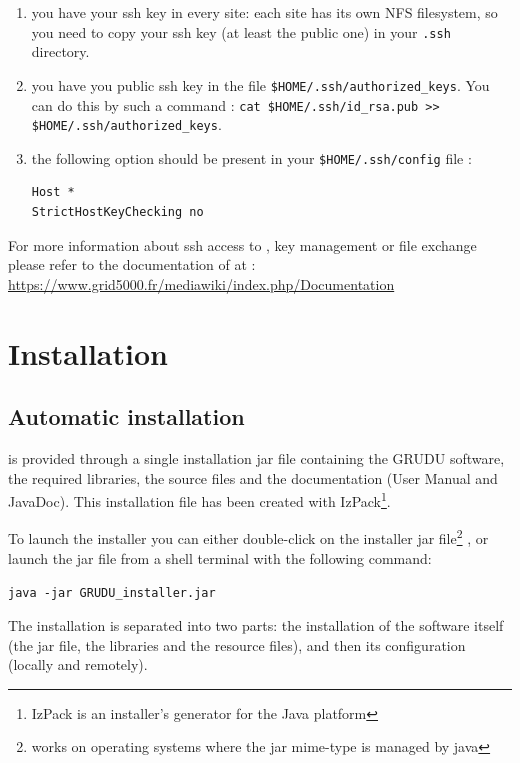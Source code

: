 \begin{enumerate}
  \item you have your ssh key in every site: each \gfk site has its own
  NFS filesystem, so you need to copy your ssh key (at least the
  public one) in your \verb|.ssh| directory.
  \item you have you public ssh key in the file
  \verb|$HOME/.ssh/authorized_keys|. You can do this by such a command :
  \verb|cat $HOME/.ssh/id_rsa.pub >> $HOME/.ssh/authorized_keys|.
  \item the following option should be present in your \verb|$HOME/.ssh/config|
  file :\\
  \begin{verbatim}
Host *
StrictHostKeyChecking no
\end{verbatim}
\end{enumerate}

For more information about ssh access to \gfk, key management or file exchange
please refer to the documentation of \gfk at : \url{https://www.grid5000.fr/mediawiki/index.php/Documentation}

\section{Installation}

\subsection{Automatic installation}

\grudu is provided through a single installation jar file containing the GRUDU
software, the required libraries, the source files and the documentation (User
Manual and JavaDoc). This installation file has been created with IzPack\footnote{IzPack is an installer's generator for the Java platform}.

To launch the installer you can either double-click on the installer jar file\footnote{works on operating systems where the jar mime-type is managed by java}
, or launch the jar file from a shell terminal with the following command:\\
\begin{center}
\texttt{java -jar GRUDU\_installer.jar}
\end{center}


The installation is separated into two parts: the installation of the software
itself (the jar file, the libraries and the resource files), and then its
configuration (locally and remotely).


